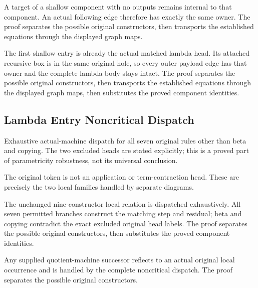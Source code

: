 A target of a shallow component with no outputs remains internal to that
component. An actual following edge therefore has exactly the same owner.
The proof separates the possible original constructors, then transports the established equations through the displayed graph maps.
\par{}

The first shallow entry is already the actual matched lambda head.
Its attached recursive box is in the same original hole, so every outer
payload edge has that owner and the complete lambda body stays intact.
The proof separates the possible original constructors, then transports the established equations through the displayed graph maps, then substitutes the proved component identities.
\par{}

\subsection{Lambda Entry Noncritical Dispatch}
Exhaustive actual-machine dispatch for all seven original rules other
than beta and copying. The two excluded heads are stated explicitly; this
is a proved part of parametricity robustness, not its universal conclusion.

The original token is not an application or term-contraction head.
These are precisely the two local families handled by separate diagrams.
\par{}

The unchanged nine-constructor local relation is dispatched exhaustively.
All seven permitted branches construct the matching step and residual; beta
and copying contradict the exact excluded original head labels.
The proof separates the possible original constructors, then substitutes the proved component identities.
\par{}

Any supplied quotient-machine successor reflects to an actual original
local occurrence and is handled by the complete noncritical dispatch.
The proof separates the possible original constructors.
\par{}

